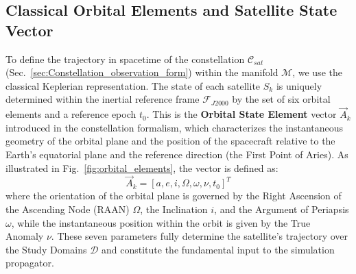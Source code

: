 
\subsection{Classical Orbital Elements and Satellite State Vector}
\label{sec:classical_orbital_elements}

To define the trajectory in spacetime of the constellation $\mathcal{C}_{sat}$ (Sec.~\ref{sec:Constellation_observation_form}) within the manifold $\mathcal{M}$, we use the classical Keplerian representation. The state of each satellite $S_k$ is uniquely determined within the inertial reference frame $\mathcal{F}_{J2000}$ by the set of six orbital elements and a reference epoch $t_0$. This is the \textbf{Orbital State Element} vector $\vec{A}_k$ introduced in the constellation formalism, which characterizes the instantaneous geometry of the orbital plane and the position of the spacecraft relative to the Earth's equatorial plane and the reference direction (the First Point of Aries). As illustrated in Fig.~\ref{fig:orbital_elements}, the vector is defined as:
\begin{equation}
    \vec{A}_k = [a, e, i, \Omega, \omega, \nu, t_0]^T
    \label{eq:orbital_state_vector}
\end{equation}
where the orientation of the orbital plane is governed by the Right Ascension of the Ascending Node (RAAN) $\Omega$, the Inclination $i$, and the Argument of Periapsis $\omega$, while the instantaneous position within the orbit is given by the True Anomaly $\nu$. These seven parameters fully determine the satellite's trajectory over the Study Domains $\mathcal{D}$ and constitute the fundamental input to the simulation propagator.

